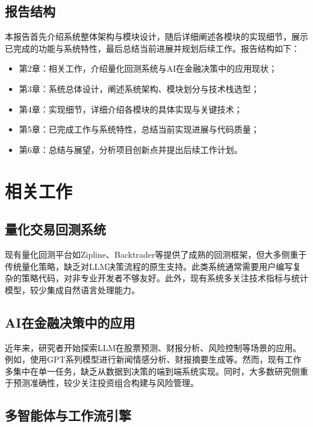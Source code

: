 \documentclass[12pt,a4paper]{ctexart}
\begin{document}
\subsection{报告结构}

本报告首先介绍系统整体架构与模块设计，随后详细阐述各模块的实现细节，展示已完成的功能与系统特性，最后总结当前进展并规划后续工作。报告结构如下：

\begin{itemize}
    \item 第2章：相关工作，介绍量化回测系统与AI在金融决策中的应用现状；
    \item 第3章：系统总体设计，阐述系统架构、模块划分与技术栈选型；
    \item 第4章：实现细节，详细介绍各模块的具体实现与关键技术；
    \item 第5章：已完成工作与系统特性，总结当前实现进展与代码质量；
    \item 第6章：总结与展望，分析项目创新点并提出后续工作计划。
\end{itemize}

\section{相关工作}

\subsection{量化交易回测系统}

现有量化回测平台如Zipline、Backtrader等提供了成熟的回测框架，但大多侧重于传统量化策略，缺乏对LLM决策流程的原生支持。此类系统通常需要用户编写复杂的策略代码，对非专业开发者不够友好。此外，现有系统多关注技术指标与统计模型，较少集成自然语言处理能力。

\subsection{AI在金融决策中的应用}

近年来，研究者开始探索LLM在股票预测、财报分析、风险控制等场景的应用。例如，使用GPT系列模型进行新闻情感分析、财报摘要生成等。然而，现有工作多集中在单一任务，缺乏从数据到决策的端到端系统实现。同时，大多数研究侧重于预测准确性，较少关注投资组合构建与风险管理。

\subsection{多智能体与工作流引擎}
\end{document}
